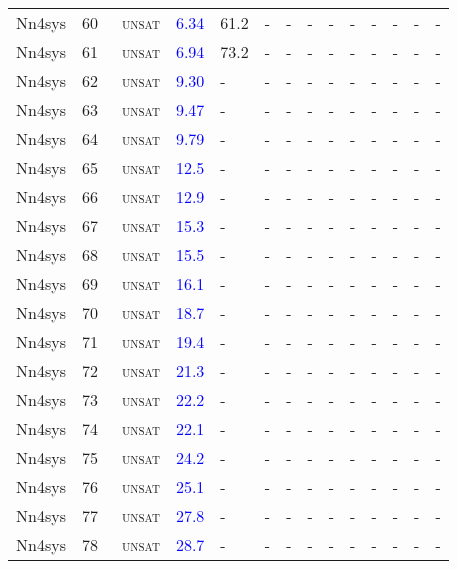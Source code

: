 \begin{center}
{\begin{longtable}{@{}llllllllllllll@{}}
Nn4sys & 60 & ~\textsc{unsat} & \textcolor{blue}{6.34} & \textcolor{second}{61.2} & - & - & - & - & - & - & - & - & - \\
Nn4sys & 61 & ~\textsc{unsat} & \textcolor{blue}{6.94} & \textcolor{second}{73.2} & - & - & - & - & - & - & - & - & - \\
Nn4sys & 62 & ~\textsc{unsat} & \textcolor{blue}{9.30} & - & - & - & - & - & - & - & - & - & - \\
Nn4sys & 63 & ~\textsc{unsat} & \textcolor{blue}{9.47} & - & - & - & - & - & - & - & - & - & - \\
Nn4sys & 64 & ~\textsc{unsat} & \textcolor{blue}{9.79} & - & - & - & - & - & - & - & - & - & - \\
Nn4sys & 65 & ~\textsc{unsat} & \textcolor{blue}{12.5} & - & - & - & - & - & - & - & - & - & - \\
Nn4sys & 66 & ~\textsc{unsat} & \textcolor{blue}{12.9} & - & - & - & - & - & - & - & - & - & - \\
Nn4sys & 67 & ~\textsc{unsat} & \textcolor{blue}{15.3} & - & - & - & - & - & - & - & - & - & - \\
Nn4sys & 68 & ~\textsc{unsat} & \textcolor{blue}{15.5} & - & - & - & - & - & - & - & - & - & - \\
Nn4sys & 69 & ~\textsc{unsat} & \textcolor{blue}{16.1} & - & - & - & - & - & - & - & - & - & - \\
Nn4sys & 70 & ~\textsc{unsat} & \textcolor{blue}{18.7} & - & - & - & - & - & - & - & - & - & - \\
Nn4sys & 71 & ~\textsc{unsat} & \textcolor{blue}{19.4} & - & - & - & - & - & - & - & - & - & - \\
Nn4sys & 72 & ~\textsc{unsat} & \textcolor{blue}{21.3} & - & - & - & - & - & - & - & - & - & - \\
Nn4sys & 73 & ~\textsc{unsat} & \textcolor{blue}{22.2} & - & - & - & - & - & - & - & - & - & - \\
Nn4sys & 74 & ~\textsc{unsat} & \textcolor{blue}{22.1} & - & - & - & - & - & - & - & - & - & - \\
Nn4sys & 75 & ~\textsc{unsat} & \textcolor{blue}{24.2} & - & - & - & - & - & - & - & - & - & - \\
Nn4sys & 76 & ~\textsc{unsat} & \textcolor{blue}{25.1} & - & - & - & - & - & - & - & - & - & - \\
Nn4sys & 77 & ~\textsc{unsat} & \textcolor{blue}{27.8} & - & - & - & - & - & - & - & - & - & - \\
Nn4sys & 78 & ~\textsc{unsat} & \textcolor{blue}{28.7} & - & - & - & - & - & - & - & - & - & - \\

\end{longtable}}
\end{center}
